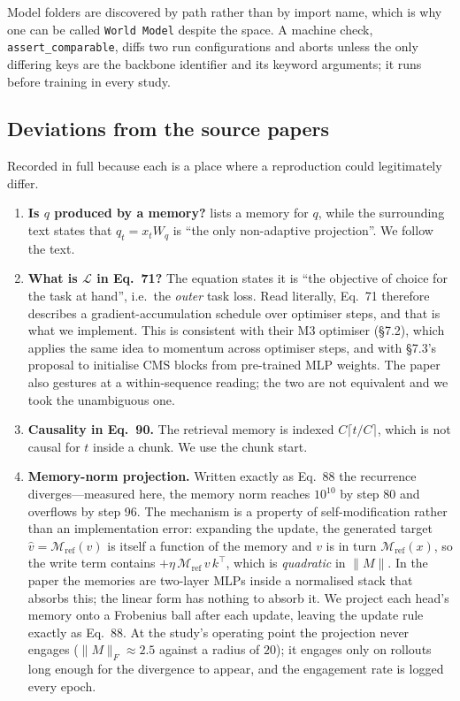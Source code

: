 \documentclass[11pt,a4paper]{article}
\newcommand{\code}[1]{\texttt{\small #1}}
\begin{document}
Model folders are discovered by path rather than by import name, which is why one
can be called \code{World Model} despite the space. A machine check,
\code{assert\_comparable}, diffs two run configurations and aborts unless the only
differing keys are the backbone identifier and its keyword arguments; it runs
before training in every study.

\subsection{Deviations from the source papers}
\label{sec:deviations}

Recorded in full because each is a place where a reproduction could legitimately
differ.

\begin{enumerate}[leftmargin=*]
\item \textbf{Is $q$ produced by a memory?} \cite[Eq.~94]{behrouz2025nested}
lists a memory for $q$, while the surrounding text states that $q_t=x_tW_q$ is
``the only non-adaptive projection''. We follow the text.

\item \textbf{What is $\mathcal{L}$ in Eq.~71?} The equation states it is ``the
objective of choice for the task at hand'', i.e.\ the \emph{outer} task loss.
Read literally, Eq.~71 therefore describes a gradient-accumulation schedule over
optimiser steps, and that is what we implement. This is consistent with their M3
optimiser (\S7.2), which applies the same idea to momentum across optimiser
steps, and with \S7.3's proposal to initialise CMS blocks from pre-trained MLP
weights. The paper also gestures at a within-sequence reading; the two are not
equivalent and we took the unambiguous one.

\item \textbf{Causality in Eq.~90.} The retrieval memory is indexed
$C\lceil t/C\rceil$, which is not causal for $t$ inside a chunk. We use the
chunk start.

\item \textbf{Memory-norm projection.} Written exactly as Eq.~88 the recurrence
diverges---measured here, the memory norm reaches $10^{10}$ by step 80 and
overflows by step 96. The mechanism is a property of self-modification rather
than an implementation error: expanding the update, the generated target
$\hat v=\mathcal{M}_{\mathrm{ref}}(v)$ is itself a function of the memory and
$v$ is in turn $\mathcal{M}_{\mathrm{ref}}(x)$, so the write term contains
$+\eta\,\mathcal{M}_{\mathrm{ref}}\,v\,k^{\!\top}$, which is \emph{quadratic} in
$\lVert M\rVert$. In the paper the memories are two-layer MLPs inside a
normalised stack that absorbs this; the linear form has nothing to absorb it. We
project each head's memory onto a Frobenius ball after each update, leaving the
update rule exactly as Eq.~88. At the study's operating point the projection
never engages ($\lVert M\rVert_F\!\approx\!2.5$ against a radius of $20$); it
engages only on rollouts long enough for the divergence to appear, and the
engagement rate is logged every epoch.


\end{enumerate}
\end{document}
